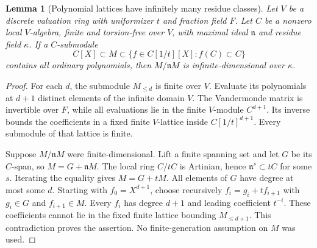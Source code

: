 \documentclass[11pt,a4paper]{article}
\newtheorem{lemma}[theorem]{Lemma}
\theoremstyle{definition}
\begin{document}
\begin{lemma}[Polynomial lattices have infinitely many residue classes]\label{result-45}
Let $V$ be a discrete valuation ring with uniformizer $t$ and fraction
field $F$. Let $C$ be a nonzero local $V$-algebra, finite and
torsion-free over $V$, with maximal ideal $\mathfrak n$ and residue
field $\kappa$. If a $C$-submodule
\[
 C[X]\subset M\subset
 \{f\in C[1/t][X]:f(C)\subset C\}
\]
contains all ordinary polynomials, then $M/\mathfrak nM$ is
infinite-dimensional over $\kappa$.
\end{lemma}
\begin{proof}
For each $d$, the submodule $M_{\le d}$ is finite over $V$.
Evaluate its polynomials at $d+1$ distinct elements of the infinite
domain $V$. The Vandermonde matrix is invertible over $F$, while
all evaluations lie in the finite $V$-module $C^{d+1}$.
Its inverse bounds the coefficients in a fixed finite $V$-lattice
inside $C[1/t]^{d+1}$. Every submodule of that lattice is finite.

Suppose $M/\mathfrak nM$ were finite-dimensional. Lift a finite
spanning set and let $G$ be its $C$-span, so $M=G+\mathfrak nM$.
The local ring $C/tC$ is Artinian, hence
$\mathfrak n^s\subset tC$ for some $s$. Iterating the equality
gives $M=G+tM$. All elements of $G$ have degree at most some $d$.
Starting with $f_0=X^{d+1}$, choose recursively
$f_i=g_i+tf_{i+1}$ with $g_i\in G$ and $f_{i+1}\in M$.
Every $f_i$ has degree $d+1$ and leading coefficient $t^{-i}$.
These coefficients cannot lie in the fixed finite lattice bounding
$M_{\le d+1}$. This contradiction proves the assertion.
No finite-generation assumption on $M$ was used.
\end{proof}
\end{document}
